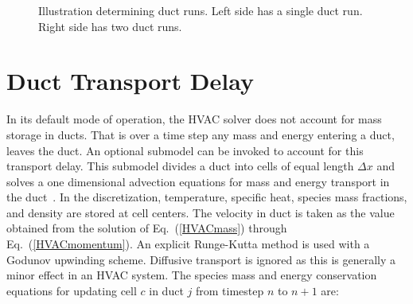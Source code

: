 \begin{figure}[ht!]
   \begin{center}
      \caption[Illustration of determining duct runs]{\label{HVAC_ductrun} Illustration determining duct runs. Left side has a single duct run. Right side has two duct runs.}
   \end{center}
\end{figure}

\section{Duct Transport Delay}
\label{sec:duct_transport}

In its default mode of operation, the HVAC solver does not account for mass storage in ducts. That is over a time step any mass and energy entering a duct, leaves the duct. An optional submodel can be invoked to account for this transport delay. This submodel divides a duct into cells of equal length $\Delta x$ and solves a one dimensional advection equations for mass and energy transport in the duct~\cite{Ralph:3}. In the discretization, temperature, specific heat, species mass fractions, and density are stored at cell centers. The velocity in duct is taken as the value obtained from the solution of Eq.~(\ref{HVACmass}) through Eq.~(\ref{HVACmomentum}). An explicit Runge-Kutta method is used with a Godunov upwinding scheme. Diffusive transport is ignored as this is generally a minor effect in an HVAC system. The species mass and energy conservation equations for updating cell $c$ in duct $j$ from timestep $n$ to $n+1$ are:


